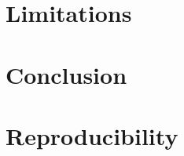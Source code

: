 \documentclass[11pt,a4paper]{article}
\begin{document}
\section{Limitations}


% 

\section{Conclusion}


% 




\appendix

\section{Reproducibility}

\end{document}

